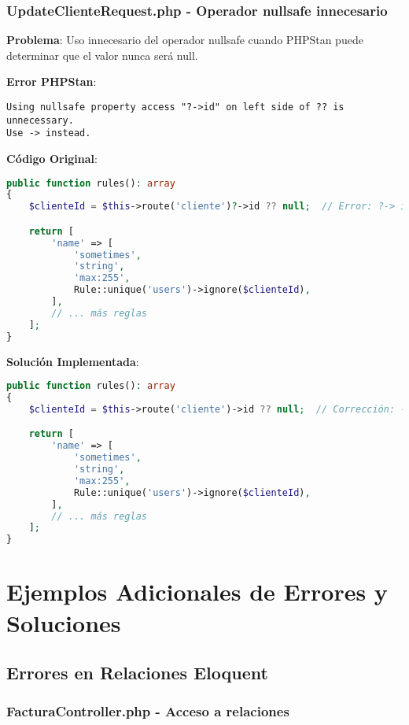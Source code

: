\documentclass[12pt,a4paper]{article}
\begin{document}
\subsubsection{UpdateClienteRequest.php - Operador nullsafe innecesario}

\textbf{Problema}: Uso innecesario del operador nullsafe cuando PHPStan puede determinar que el valor nunca será null.

\textbf{Error PHPStan}:
\begin{lstlisting}[caption=Error en UpdateClienteRequest.php]
Using nullsafe property access "?->id" on left side of ?? is unnecessary.
Use -> instead.
\end{lstlisting}

\textbf{Código Original}:
\begin{lstlisting}[language=php, caption=UpdateClienteRequest.php - Operador nullsafe innecesario]
public function rules(): array
{
    $clienteId = $this->route('cliente')?->id ?? null;  // Error: ?-> innecesario

    return [
        'name' => [
            'sometimes',
            'string',
            'max:255',
            Rule::unique('users')->ignore($clienteId),
        ],
        // ... más reglas
    ];
}
\end{lstlisting}

\textbf{Solución Implementada}:
\begin{lstlisting}[language=php, caption=UpdateClienteRequest.php - Corrección]
public function rules(): array
{
    $clienteId = $this->route('cliente')->id ?? null;  // Corrección: -> en lugar de ?->

    return [
        'name' => [
            'sometimes',
            'string',
            'max:255',
            Rule::unique('users')->ignore($clienteId),
        ],
        // ... más reglas
    ];
}
\end{lstlisting}

\section{Ejemplos Adicionales de Errores y Soluciones}

\subsection{Errores en Relaciones Eloquent}

\subsubsection{FacturaController.php - Acceso a relaciones}
\end{document}
